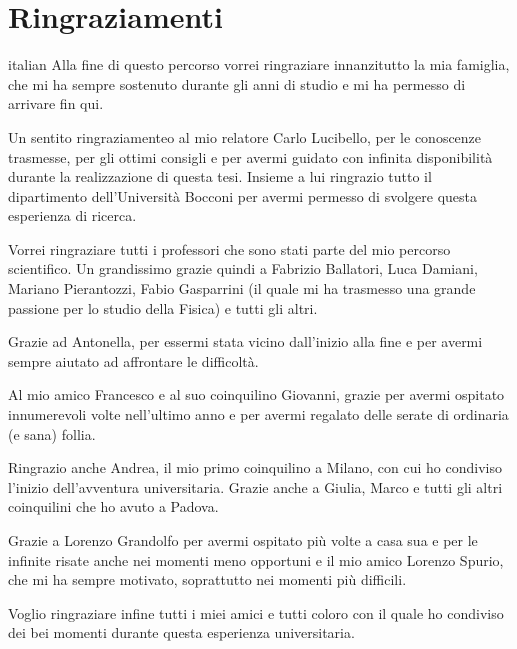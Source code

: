 \chapter*{Ringraziamenti}
\begin{otherlanguage*}{italian}
   Alla fine di questo percorso vorrei ringraziare innanzitutto la mia famiglia, che mi ha sempre sostenuto durante gli anni di studio e mi ha permesso di arrivare fin qui.

Un sentito ringraziamenteo al mio relatore Carlo Lucibello, per le conoscenze trasmesse, per gli ottimi consigli e per avermi guidato con infinita disponibilità durante la realizzazione di questa tesi. Insieme a lui ringrazio tutto il dipartimento dell'Università Bocconi per avermi permesso di svolgere questa esperienza di ricerca.

Vorrei ringraziare tutti i professori che sono stati parte del mio percorso scientifico. Un grandissimo grazie quindi a Fabrizio Ballatori, Luca Damiani, Mariano Pierantozzi, Fabio Gasparrini (il quale mi ha trasmesso una grande passione per lo studio della Fisica) e tutti gli altri.

Grazie ad Antonella, per essermi stata vicino dall'inizio alla fine e per avermi sempre aiutato ad affrontare le difficoltà.

Al mio amico Francesco e al suo coinquilino Giovanni, grazie per avermi ospitato innumerevoli volte nell'ultimo anno e per avermi regalato delle serate di ordinaria (e sana) follia.

Ringrazio anche Andrea, il mio primo coinquilino a Milano, con cui ho condiviso l'inizio dell'avventura universitaria. Grazie anche a Giulia, Marco e tutti gli altri coinquilini che ho avuto a Padova.

Grazie a Lorenzo Grandolfo per avermi ospitato più volte a casa sua e per le infinite risate anche nei momenti meno opportuni e il mio amico Lorenzo Spurio, che mi ha sempre motivato, soprattutto nei momenti più difficili.

Voglio ringraziare infine tutti i miei amici e tutti coloro con il quale ho condiviso dei bei momenti durante questa esperienza universitaria.
 
\end{otherlanguage*}




